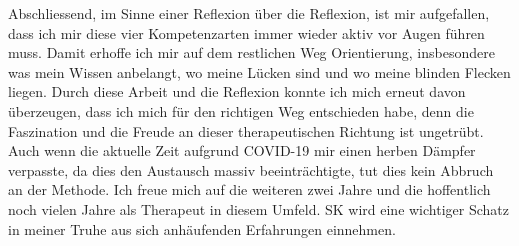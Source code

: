 Abschliessend, im Sinne einer Reflexion über die Reflexion, ist mir aufgefallen, dass ich mir diese vier Kompetenzarten immer wieder aktiv vor Augen führen muss. Damit erhoffe ich mir auf dem restlichen Weg Orientierung, insbesondere was mein Wissen anbelangt, wo meine Lücken sind und wo meine blinden Flecken liegen. Durch diese Arbeit und die Reflexion konnte ich mich erneut davon überzeugen, dass ich mich für den richtigen Weg entschieden habe, denn die Faszination und die Freude an dieser therapeutischen Richtung ist ungetrübt. Auch wenn die aktuelle Zeit aufgrund COVID-19 mir einen herben Dämpfer verpasste, da dies den Austausch massiv beeinträchtigte, tut dies kein Abbruch an der Methode. Ich freue mich auf die weiteren zwei Jahre und die hoffentlich noch vielen Jahre als Therapeut in diesem Umfeld. SK wird eine wichtiger Schatz in meiner Truhe aus sich anhäufenden Erfahrungen einnehmen.
